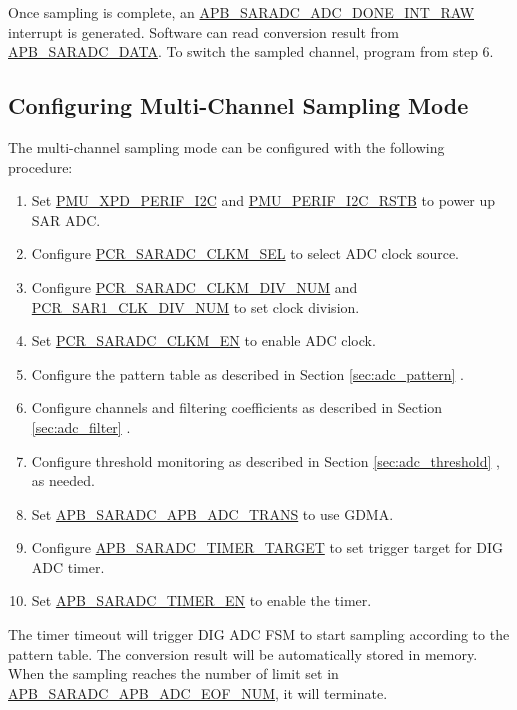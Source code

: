 \documentclass[main\_\_EN.tex]{subfiles}
\begin{document}
Once sampling is complete, an \hyperref[fielddesc:APBSARADCDONEINTRAW]{APB\_SARADC\_ADC\_DONE\_INT\_RAW} interrupt is generated. Software can read conversion result from \hyperref[fielddesc:APBSARADCDATA]{APB\_SARADC\_DATA}. To switch the sampled channel, program from step 6.

\subsection{Configuring Multi-Channel Sampling Mode}

The multi-channel sampling mode can be configured with the following procedure:

\begin{enumerate}
    \item Set \hyperref[fielddesc:PMUXPDPERIFI2C]{PMU\_XPD\_PERIF\_I2C} and \hyperref[fielddesc:PMUPERIFI2CRSTB]{PMU\_PERIF\_I2C\_RSTB} to power up SAR ADC.
    \item Configure \hyperref[fielddesc:PCRSARADCCLKMSEL]{PCR\_SARADC\_CLKM\_SEL} to select ADC clock source.
    \item Configure \hyperref[fielddesc:PCRSARADCCLKMDIVNUM]{PCR\_SARADC\_CLKM\_DIV\_NUM} and \hyperref[fielddesc:PCRSAR1CLKDIVNUM]{PCR\_SAR1\_CLK\_DIV\_NUM} to set clock division.
    \item Set \hyperref[fielddesc:PCRSARADCCLKMEN]{PCR\_SARADC\_CLKM\_EN} to enable ADC clock.
    \item Configure the pattern table as described in Section \ref{sec:adc_pattern} \textit{}.
    \item Configure channels and filtering coefficients as described in Section \ref{sec:adc_filter} \textit{}.
    \item Configure threshold monitoring as described in Section \ref{sec:adc_threshold} \textit{}, as needed.
    \item Set \hyperref[fielddesc:APBSARADCAPBADCTRANS]{APB\_SARADC\_APB\_ADC\_TRANS} to use GDMA.
    \item Configure \hyperref[fielddesc:APBSARADCTIMERTARGET]{APB\_SARADC\_TIMER\_TARGET} to set trigger target for DIG ADC timer.
    \item Set \hyperref[fielddesc:APBSARADCTIMEREN]{APB\_SARADC\_TIMER\_EN} to enable the timer.
\end{enumerate}

The timer timeout will trigger DIG ADC FSM to start sampling according to the pattern table. The conversion result will be automatically stored in memory. When the sampling reaches the number of limit set in  \hyperref[fielddesc:APBSARADCAPBADCEOFNUM]{APB\_SARADC\_APB\_ADC\_EOF\_NUM}, it will terminate.
\end{document}
